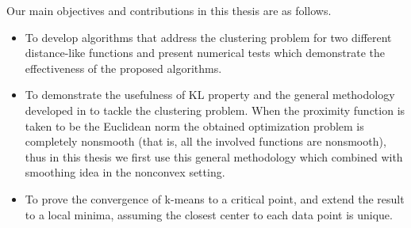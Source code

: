 Our main objectives and contributions in this thesis are as follows.
\begin{itemize}
	\item To develop algorithms that address the clustering problem for two different distance-like functions and present numerical tests which demonstrate the effectiveness of the proposed algorithms.
	
	\item To demonstrate the usefulness of KL property and the general methodology developed in \cite{BST2014} to tackle the clustering problem. When the proximity function is taken to be the Euclidean norm the obtained optimization problem is completely nonsmooth (that is, all the involved functions are nonsmooth), thus in this thesis we first use this general methodology which combined with smoothing idea in the nonconvex setting.
  
	\item To prove the convergence of k-means to a critical point, and extend the result to a local minima, assuming the closest center to each data point is unique.
\end{itemize}

